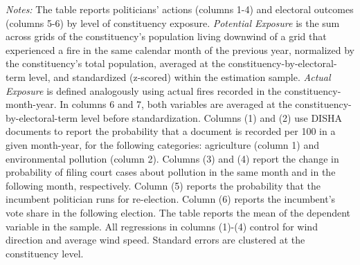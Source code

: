 \documentclass[12pt]{article}
\begin{document}
\begin{table}[htbp!] 
\caption{Pollution Exposure, Politicians' Actions, and Electoral Consequences, Any Fire $\times$ Downwind Population}\label{tab:mechanism}
        \resizebox{\linewidth}{!}{
        
        }
    \begin{minipage}{\textwidth}
        {\footnotesize \textit{Notes:} The table reports politicians' actions (columns 1-4) and electoral outcomes (columns 5-6) by level of constituency exposure.
        \textit{Potential Exposure} is the sum across  grids of the constituency's population living downwind of a grid that experienced a fire in the same calendar month of the previous year, normalized by the constituency's total population, averaged at the constituency-by-electoral-term level, and standardized (z-scored) within the estimation sample.
        \textit{Actual Exposure} is defined analogously using actual fires recorded in the   constituency-month-year. In columns 6 and 7, both variables are averaged at  the constituency-by-electoral-term level before standardization.
        Columns (1) and (2) use DISHA documents to report the probability that a document is recorded per 100 in a given month-year, for the following categories: agriculture (column 1) and environmental pollution (column 2). Columns (3) and (4) report the change in probability of filing court cases about pollution in the same month and in the following month, respectively. Column (5) reports the probability that the incumbent politician runs for re-election. Column (6) reports the incumbent's vote share in the following election.
        The table reports the mean of the dependent variable in the sample. All regressions in columns (1)-(4) control for wind direction and average wind speed. Standard errors are clustered at the constituency level.
        }
    \end{minipage}
\end{table}
\end{document}
